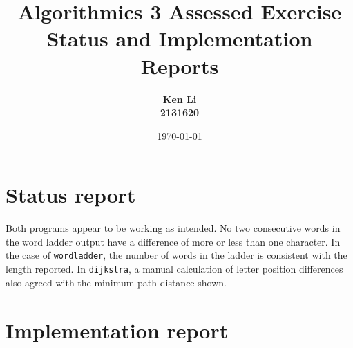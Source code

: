 \documentclass{article}
\title{Algorithmics 3 Assessed Exercise\\ \vspace{4mm}
Status and Implementation Reports}
\author{\bf Ken Li\\ \bf 2131620}
\date{\today}
\begin{document}
\maketitle

\section*{Status report}

Both programs appear to be working as intended. No two consecutive words in the word ladder output have a difference of more or less than one character. In the case of \texttt{wordladder}, the number of words in the ladder is consistent with the length reported. In \texttt{dijkstra}, a manual calculation of letter position differences also agreed with the minimum path distance shown.

\section*{Implementation report}
\end{document}
